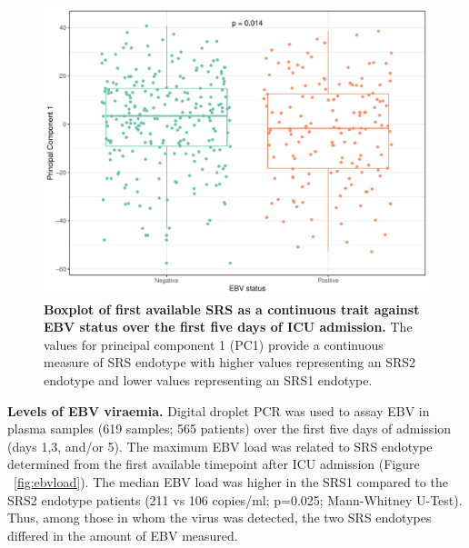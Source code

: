 \begin{figure}[htbp]
\centering
\includegraphics[scale=0.6]{./Results3/Images/SRS_jitter.pdf}
\caption[EBV-positivity and SRS status]{\textbf{Boxplot of first available SRS as a continuous trait against EBV status over the first five days of ICU admission.} The values for principal component 1 (PC1) provide a continuous measure of SRS endotype with higher values representing an SRS2 endotype and lower values representing an SRS1 endotype. }
\label{fig:ebvsrs}
\end{figure}
\FloatBarrier

\textbf{Levels of EBV viraemia.} 
Digital droplet PCR was used to assay EBV in plasma samples (619 samples; 565 patients) over the first five days of admission (days 1,3, and/or 5). The maximum EBV load was related to SRS endotype determined from the first available timepoint after ICU admission (Figure ~\ref{fig:ebvload}). The median EBV load was higher in the SRS1 compared to the SRS2 endotype patients (211 vs 106 copies/ml; p=0.025; Mann-Whitney U-Test). Thus, among those in whom the virus was detected, the two SRS endotypes differed in the amount of EBV measured.

